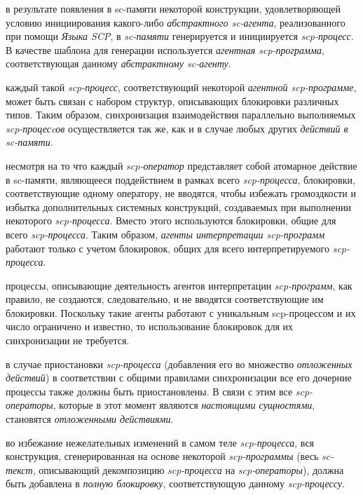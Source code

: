 \begin{textitemize}
\item в результате появления в sc-памяти некоторой конструкции, удовлетворяющей условию инициирования какого-либо \textit{абстрактного sc-агента}, реализованного при помощи \textit{Языка SCP}, в \textit{sc-памяти} генерируется и инициируется \textit{scp-процесс}. В качестве шаблона для генерации используется \textit{агентная scp-программа}, соответствующая данному \textit{абстрактному sc-агенту}.
\item каждый такой \textit{scp-процесс}, соответствующий некоторой \textit{агентной \mbox{scp-программе}}, может быть связан с набором структур, описывающих блокировки различных типов. Таким образом, синхронизация взаимодействия параллельно выполняемых \textit{scp-процесcов} осуществляется так же, как и в случае любых других \textit{действий в sc-памяти}.
\item несмотря на то что каждый \textit{scp-оператор} представляет собой атомарное действие в sc-памяти, являющееся поддействием в рамках всего \textit{\mbox{scp-процесса}}, блокировки, соответствующие одному оператору, не вводятся, чтобы избежать громоздкости и избытка дополнительных системных конструкций, создаваемых при выполнении некоторого \textit{scp-процесса}. Вместо этого используются блокировки, общие для всего \textit{scp-процесса}. Таким образом, \textit{агенты интерпретации scp-программ} работают только с учетом блокировок, общих для всего интерпретируемого \textit{scp-процесса}.
\item процессы, описывающие деятельность агентов интерпретации \textit{scp-программ}, как правило, не создаются, следовательно, и не вводятся соответствующие им блокировки. Поскольку такие агенты работают с уникальным scp-процессом и их число ограничено и известно, то использование блокировок для их синхронизации не требуется.
\item в случае приостановки \textit{scp-процесса} (добавления его во множество \textit{отложенных действий}) в соответствии с общими правилами синхронизации все его дочерние процессы также должны быть	приостановлены. В связи с этим все \textit{scp-операторы}, которые в	этот момент являются \textit{настоящими сущностями}, становятся	\textit{отложенными действиями}.
\item во избежание нежелательных изменений в самом теле \textit{scp-процесса}, вся конструкция, сгенерированная на основе некоторой \textit{scp-программы} (весь \textit{sc-текст}, описывающий декомпозицию \textit{scp-процесса} на \textit{scp-операторы}), должна быть добавлена в \textit{полную блокировку}, соответствующую данному \textit{scp-процессу}.

\end{textitemize}
